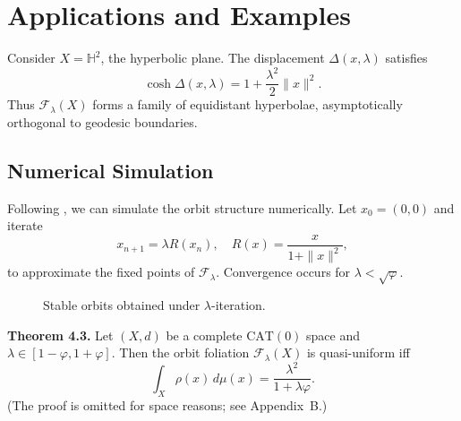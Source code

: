 \documentclass{amsart}
\begin{document}
\section{Applications and Examples}

Consider %
$X = \mathbb{H}^2$, the hyperbolic plane.  
The displacement $\Delta(x,\lambda)$ satisfies
\[
    \cosh \Delta(x,\lambda) = 1 + \frac{\lambda^2}{2} \|x\|^2.
\]
Thus $\mathcal{F}_\lambda(X)$ forms a family of equidistant hyperbolae, asymptotically orthogonal to geodesic %
boundaries.

\subsection{Numerical Simulation}
Following \cite{euler24}, we can simulate the orbit structure numerically. %
Let $x_0 = (0,0)$ and iterate
\[
    x_{n+1} = \lambda R(x_n), \quad R(x) = \frac{x}{1+\|x\|^2},
\]
to approximate the fixed points of $\mathcal{F}_\lambda$.  
Convergence occurs for $\lambda < \sqrt{\varphi}$.

\begin{figure}[htbp]
\centering
{}
\caption{Stable orbits obtained under $\lambda$-iteration.}
\end{figure}


\textbf{Theorem 4.3.} 
Let $(X,d)$ be a complete $\mathrm{CAT}(0)$ space and $\lambda \in [1-\varphi,1+\varphi]$.  
Then the orbit foliation $\mathcal{F}_\lambda(X)$ is %
quasi-uniform iff
\begin{equation}
    \int_X \rho(x)\, d\mu(x) = \frac{\lambda^2}{1+\lambda\varphi}.
\end{equation}
(The proof %
is omitted for space reasons; see %
Appendix~B.)
\end{document}
